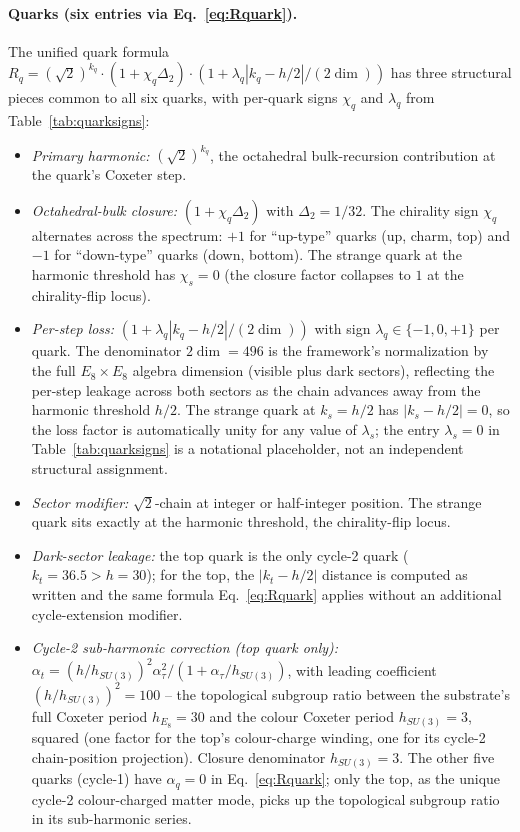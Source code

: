 ﻿\documentclass[reprint,amsmath,amssymb,aps,prd,longbibliography,floatfix]{revtex4-2}
\begin{document}
\paragraph{Quarks (six entries via Eq.~\eqref{eq:Rquark}).}
The unified quark formula
$R_q = (\sqrt{2})^{k_q} \cdot (1 + \chi_q \Delta_2) \cdot
(1 + \lambda_q |k_q - h/2|/(2\dim))$ has three structural pieces
common to all six quarks, with per-quark signs $\chi_q$ and
$\lambda_q$ from Table~\ref{tab:quarksigns}:
\begin{itemize}
\item \emph{Primary harmonic:} $(\sqrt{2})^{k_q}$, the octahedral
bulk-recursion contribution at the quark's Coxeter step.
\item \emph{Octahedral-bulk closure:} $(1 + \chi_q \Delta_2)$ with
$\Delta_2 = 1/32$. The chirality sign $\chi_q$ alternates across
the spectrum: $+1$ for ``up-type'' quarks (up, charm, top) and $-1$
for ``down-type'' quarks (down, bottom). The strange quark at the
harmonic threshold has $\chi_s = 0$ (the closure factor collapses to
$1$ at the chirality-flip locus).
\item \emph{Per-step loss:} $(1 + \lambda_q |k_q - h/2|/(2\dim))$
with sign $\lambda_q \in \{-1, 0, +1\}$ per quark. The denominator
$2\dim = 496$ is the framework's normalization by the full
$E_8 \times E_8$ algebra dimension (visible plus dark sectors),
reflecting the per-step leakage across both sectors as the chain advances away from the harmonic threshold
$h/2$. The strange quark at $k_s = h/2$ has $|k_s - h/2| = 0$, so
the loss factor is automatically unity for any value of $\lambda_s$;
the entry $\lambda_s = 0$ in Table~\ref{tab:quarksigns} is a
notational placeholder, not an independent structural assignment.
\item \emph{Sector modifier:} $\sqrt{2}$-chain at integer or
half-integer position. The strange quark sits exactly at the
harmonic threshold, the chirality-flip locus.
\item \emph{Dark-sector leakage:} the top quark is the only cycle-2
quark ($k_t = 36.5 > h = 30$); for the top, the $|k_t - h/2|$
distance is computed as written and the same formula
Eq.~\eqref{eq:Rquark} applies without an additional cycle-extension
modifier.
\item \emph{Cycle-2 sub-harmonic correction (top quark only):} $\alpha_t = (h/h_{SU(3)})^2 \alpha_\tau^2 / (1 + \alpha_\tau / h_{SU(3)})$, with leading coefficient $(h/h_{SU(3)})^2 = 100$ -- the topological subgroup ratio between the substrate's full Coxeter period $h_{E_8} = 30$ and the colour Coxeter period $h_{SU(3)} = 3$, squared (one factor for the top's colour-charge winding, one for its cycle-2 chain-position projection). Closure denominator $h_{SU(3)} = 3$. The other five quarks (cycle-1) have $\alpha_q = 0$ in Eq.~\eqref{eq:Rquark}; only the top, as the unique cycle-2 colour-charged matter mode, picks up the topological subgroup ratio in its sub-harmonic series.
\end{itemize}
\end{document}
